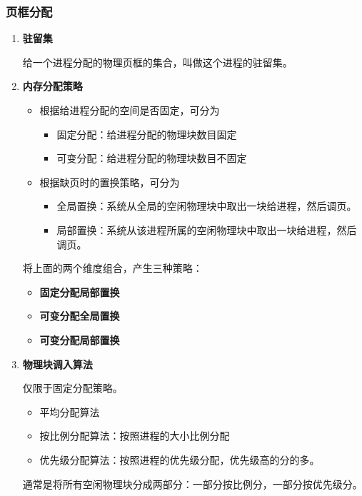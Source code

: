 \documentclass[12pt, a4paper, oneside]{ctexart}
\begin{document}
\subsubsection{页框分配}

\begin{enumerate}
  \item {\bf 驻留集}
  
  给一个进程分配的物理页框的集合，叫做这个进程的驻留集。

  \item {\bf 内存分配策略}
  
  \begin{itemize}
    \item 根据给进程分配的空间是否固定，可分为
    \begin{itemize}
      \item 固定分配：给进程分配的物理块数目固定
      \item 可变分配：给进程分配的物理块数目不固定
    \end{itemize}
    \item 根据缺页时的置换策略，可分为
    \begin{itemize}
      \item 全局置换：系统从全局的空闲物理块中取出一块给进程，然后调页。
      \item 局部置换：系统从该进程所属的空闲物理块中取出一块给进程，然后调页。
    \end{itemize}
  \end{itemize}
  
  将上面的两个维度组合，产生三种策略：
  
  \begin{itemize}
    \item {\bf 固定分配局部置换}
    \item {\bf 可变分配全局置换}
    \item {\bf 可变分配局部置换}
  \end{itemize}

  \item {\bf 物理块调入算法}
  
  仅限于固定分配策略。
  \begin{itemize}
    \item 平均分配算法
    \item 按比例分配算法：按照进程的大小比例分配
    \item 优先级分配算法：按照进程的优先级分配，优先级高的分的多。
  \end{itemize}

  通常是将所有空闲物理块分成两部分：一部分按比例分，一部分按优先级分。
  

\end{enumerate}
\end{document}
